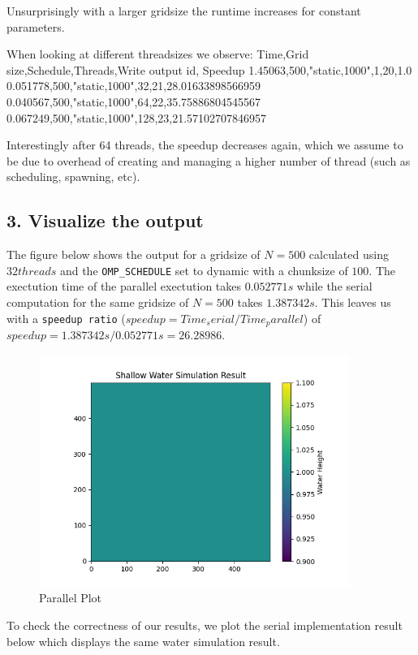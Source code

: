 \documentclass[a4paper,10pt]{article}
\begin{document}
Unsurprisingly with a larger gridsize the runtime increases for constant parameters.

When looking at different threadsizes we observe:
Time,Grid size,Schedule,Threads,Write output id, Speedup
1.45063,500,"static,1000",1,20,1.0
0.051778,500,"static,1000",32,21,28.01633898566959
0.040567,500,"static,1000",64,22,35.75886804545567
0.067249,500,"static,1000",128,23,21.57102707846957

Interestingly after 64 threads, the speedup decreases again, which we assume to be due to overhead of creating and managing a higher number of thread (such as scheduling, spawning, etc).

\subsection{3. Visualize the output}
The figure below shows the output for a gridsize of $N=500$ calculated using $32 threads$ and the \verb|OMP_SCHEDULE| set to dynamic with a 
chunksize of $ 100 $.
The exectution time of the parallel exectution takes $0.052771s$ while the serial computation for the same gridsize of $N=500$ takes $1.387342s$.  
This leaves us with a \verb|speedup ratio| ($speedup = Time_serial / Time_parallel$) of $speedup = 1.387342s/0.052771s = 26.28986 $. 


\begin{figure}[H]
  \centering
  \includegraphics[width=0.9\textwidth]{img/ex5/parallel_plot.png}
  \caption{Parallel Plot}
  \label{fig:ex5_parallel}
\end{figure}

To check the correctness of our results, we plot the serial implementation result below which displays the same water simulation result.
\end{document}
